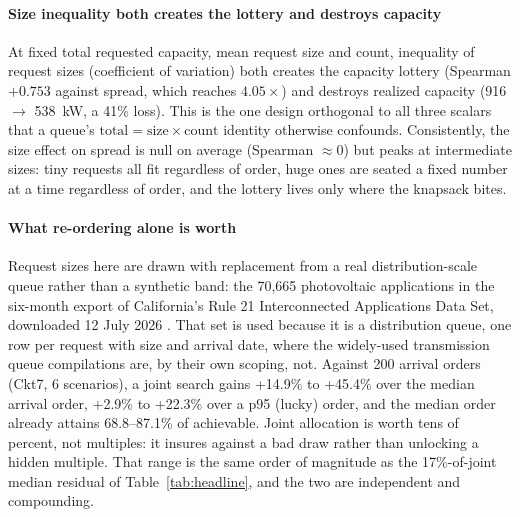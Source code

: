 \documentclass[review,authoryear,12pt]{elsarticle}
\begin{document}
\paragraph{Size inequality both creates the lottery and destroys capacity}
At fixed total requested capacity, mean request size and count, inequality of
request sizes (coefficient of variation) both creates the capacity lottery
(Spearman $+0.753$ against spread, which reaches $4.05\times$) and destroys
realized capacity (916 $\to$ 538~kW, a 41\% loss). This is the one design
orthogonal to all three scalars that a queue's $\text{total} = \text{size}
\times \text{count}$ identity otherwise confounds. Consistently, the size
effect on spread is null on average (Spearman $\approx 0$) but peaks at
intermediate sizes: tiny requests all fit regardless of order, huge ones are
seated a fixed number at a time regardless of order, and the lottery lives
only where the knapsack bites.

\paragraph{What re-ordering alone is worth}
Request sizes here are drawn with replacement from a real distribution-scale
queue rather than a synthetic band: the 70{,}665 photovoltaic applications in
the six-month export of California's Rule 21 Interconnected Applications Data
Set, downloaded 12 July 2026 \citep{cadgstats2026}. That set is used because it
is a distribution queue, one row per request with size and arrival date, where
the widely-used transmission queue compilations are, by their own scoping,
not.
Against 200 arrival orders (Ckt7, 6
scenarios), a joint search gains +14.9\% to +45.4\% over the median arrival
order, +2.9\% to +22.3\% over a p95 (lucky) order, and the median order
already attains 68.8--87.1\% of achievable. Joint allocation is worth tens of
percent, not multiples: it insures against a bad draw rather than unlocking a
hidden multiple. That range is the same order of magnitude as the
17\%-of-joint median residual of Table~\ref{tab:headline}, and the two are
independent and compounding.



\end{document}
